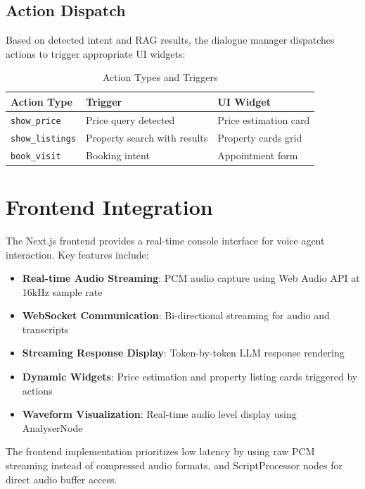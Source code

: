 \subsection{Action Dispatch}

Based on detected intent and RAG results, the dialogue manager dispatches actions to trigger appropriate UI widgets:

\begin{table}[!htbp]
\centering
\caption{Action Types and Triggers}
\label{tab:actions}
\begin{tabular}{|l|l|l|}
\hline
\textbf{Action Type} & \textbf{Trigger} & \textbf{UI Widget} \\ \hline
\texttt{show\_price} & Price query detected & Price estimation card \\ \hline
\texttt{show\_listings} & Property search with results & Property cards grid \\ \hline
\texttt{book\_visit} & Booking intent & Appointment form \\ \hline
\end{tabular}
\end{table}

\section{Frontend Integration}

The Next.js frontend provides a real-time console interface for voice agent interaction. Key features include:

\begin{itemize}
    \item \textbf{Real-time Audio Streaming}: PCM audio capture using Web Audio API at 16kHz sample rate
    \item \textbf{WebSocket Communication}: Bi-directional streaming for audio and transcripts
    \item \textbf{Streaming Response Display}: Token-by-token LLM response rendering
    \item \textbf{Dynamic Widgets}: Price estimation and property listing cards triggered by actions
    \item \textbf{Waveform Visualization}: Real-time audio level display using AnalyserNode
\end{itemize}

The frontend implementation prioritizes low latency by using raw PCM streaming instead of compressed audio formats, and ScriptProcessor nodes for direct audio buffer access.